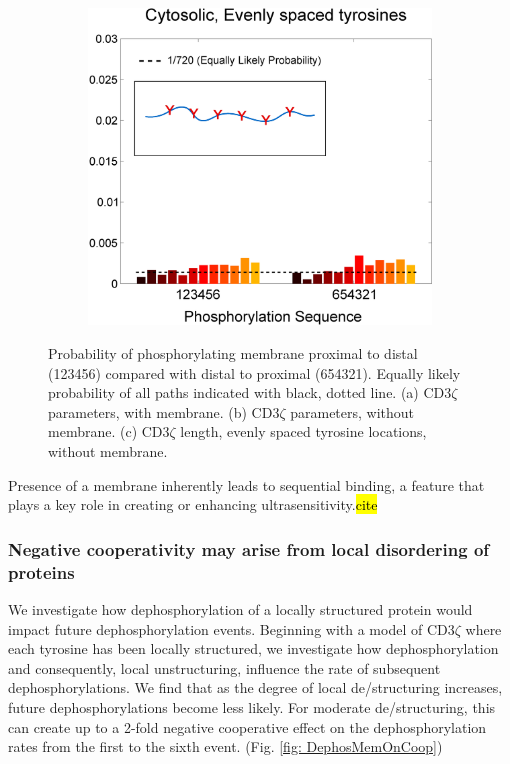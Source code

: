\documentclass[../../AdvancementSummary.tex]{subfiles}
\begin{document}
\begin{figure}[H]
\begin{center}
\begin{subfigure}{0.3\linewidth}
			\caption{}
		\end{subfigure}
		\begin{subfigure}{0.3\linewidth}
			\includegraphics[width=\linewidth]{ResultsFigures/StiffeningSequentialBinding/EvenSites/ProbVSSequence.eps}
			\caption{}
		\end{subfigure}
	\end{center}
	\caption{Probability of phosphorylating membrane proximal to distal (123456) compared with distal to proximal (654321). Equally likely probability of all paths indicated with black, dotted line. (a) CD3$\zeta$ parameters, with membrane. (b) CD3$\zeta$ parameters, without membrane. (c) CD3$\zeta$ length, evenly spaced tyrosine locations, without membrane. \label{fig: StiffeningSeqBind}}
\end{figure}


Presence of a membrane inherently leads to sequential binding, a feature that plays a key role in creating or enhancing ultrasensitivity.\hl{cite}

\subsubsection{Negative cooperativity may arise from local disordering of proteins}

We investigate how dephosphorylation of a locally structured protein would impact future dephosphorylation events. Beginning with a model of CD3$\zeta$ where each tyrosine has been locally structured, we investigate how dephosphorylation and consequently, local unstructuring, influence the rate of subsequent dephosphorylations. We find that as the degree of local de/structuring increases, future dephosphorylations become less likely. For moderate de/structuring, this can create up to a 2-fold negative cooperative effect on the dephosphorylation rates from the first to the sixth event. (Fig. \ref{fig: DephosMemOnCoop})
\end{document}
